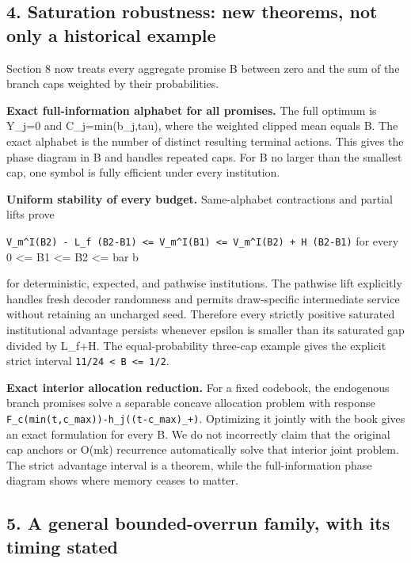 \documentclass[11pt,letterpaper]{article}
\begin{document}
\subsection*{4. Saturation robustness: new theorems, not only a historical example}


Section 8 now treats every aggregate promise B between zero and the sum of the branch caps weighted by their probabilities.



\textbf{Exact full-information alphabet for all promises.} The full optimum is Y\_j=0 and C\_j=min(b\_j,tau), where the weighted clipped mean equals B. The exact alphabet is the number of distinct resulting terminal actions. This gives the phase diagram in B and handles repeated caps. For B no larger than the smallest cap, one symbol is fully efficient under every institution.



\textbf{Uniform stability of every budget.} Same-alphabet contractions and partial lifts prove



\texttt{V\_m\textasciicircum{}I(B2) - L\_f (B2-B1) <= V\_m\textasciicircum{}I(B1) <= V\_m\textasciicircum{}I(B2) + H (B2-B1)} for every 0 <= B1 <= B2 <= bar b



for deterministic, expected, and pathwise institutions. The pathwise lift explicitly handles fresh decoder randomness and permits draw-specific intermediate service without retaining an uncharged seed. Therefore every strictly positive saturated institutional advantage persists whenever epsilon is smaller than its saturated gap divided by L\_f+H. The equal-probability three-cap example gives the explicit strict interval \texttt{11/24 < B <= 1/2}.



\textbf{Exact interior allocation reduction.} For a fixed codebook, the endogenous branch promises solve a separable concave allocation problem with response \nolinkurl{F_c(min(t,c_max))-h_j((t-c_max)_+)}. Optimizing it jointly with the book gives an exact formulation for every B. We do not incorrectly claim that the original cap anchors or O(mk) recurrence automatically solve that interior joint problem. The strict advantage interval is a theorem, while the full-information phase diagram shows where memory ceases to matter.



\subsection*{5. A general bounded-overrun family, with its timing stated}
\end{document}
